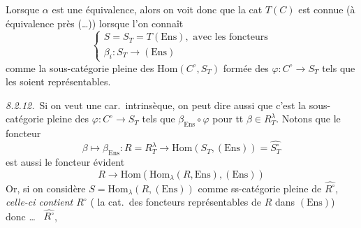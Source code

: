 \documentclass[11pt,a4paper]{article}
\begin{document}
Lorsque $\alpha$ est une \struck{\ill{}} équivalence, 
alors on voit donc que la cat  $T(C)$ est connue (à équivalence
près (…)) lorsque l'on connaît
\begin{equation}
  \begin{cases}
    S = S_{T} = T(\mathrm{Ens}), \text{ avec les foncteurs} \\
    \beta_{i} : S_{T} \longrightarrow (\mathrm{Ens})
  \end{cases}
  \tag{8.2.11}
\end{equation}
comme la sous-catégorie pleine des $\mathrm{Hom}(C^{\circ}, S_{T})$
formée des $\varphi : C^{\circ} \to S_{T}$ tels que les
 soient représentables.

\emph{8.2.12.}\ Si on veut une car.\ intrinsèque, on peut dire
aussi que c'est la sous-catégorie pleine des $\varphi : C^{\circ} \to
S_{T}$ tels que $\beta_{\mathrm{Ens}} \circ \varphi$
  pour tt $\beta \in
R^{\lambda}_{T}$. Notons que le foncteur
\begin{equation}
  \beta \longmapsto \beta_{\mathrm{Ens}} : R = R^{\lambda}_{T}
  \longrightarrow \mathrm{Hom}(S_{T}, (\mathrm{Ens})) =
  \widehat{S^{\circ}_{T}}
  \tag{8.2.13}
\end{equation}
est aussi le foncteur évident
\begin{equation}
  R \longrightarrow \mathrm{Hom}(\mathrm{Hom}_{\lambda}(R, \mathrm{Ens}),
  (\mathrm{Ens}))
  \tag{8.2.14}
\end{equation}
Or, si on considère $S = \mathrm{Hom}_{\lambda}(R, (\mathrm{Ens}))$
comme ss-catégorie pleine de $\widehat{R^{\circ}}$, \emph{celle-ci
contient $R^{\circ}$} ( la cat.\ des foncteurs
représentables de $R$ dans $(\mathrm{Ens})$) donc …\
\struck{\ill{}} $\widehat{R^{\circ}}$,
\end{document}
